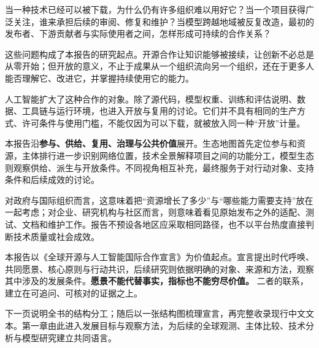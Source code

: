 \clearpage{}
\label{ch1-preface}
当一种技术已经可以被下载，为什么仍有许多组织难以用好它？当一个项目获得广泛关注，谁来承担后续的审阅、修复和维护？当模型跨越地域被反复改造，最初的发布者、下游贡献者与实际使用者之间，怎样形成可持续的合作关系？

这些问题构成了本报告的研究起点。开源合作让知识能够被接续，让创新不必总是从零开始；但开放的意义，不止于成果从一个组织流向另一个组织，还在于更多人能否理解它、改进它，并掌握持续使用它的能力。

人工智能扩大了这种合作的对象。除了源代码，模型权重、训练和评估说明、数据、工具链与运行环境，也进入开放与复用的讨论。它们并不具有相同的生产方式、许可条件与使用门槛，不能仅因为可以下载，就被放入同一种“开放”计量。

本报告沿\textbf{参与、供给、复用、治理与公共价值}展开。生态地图首先定位参与和资源，主体排行进一步识别网络位置，技术全景解释项目之间的功能分工，模型生态则观察供给、派生与开放条件。不同视角相互补充，最终服务于对行动对象、支持条件和后续成效的讨论。

对政府与国际组织而言，这意味着把“资源增长了多少”与“哪些能力需要支持”放在一起考虑；对企业、研究机构与社区而言，则意味着看见原始发布之外的适配、测试、文档和维护工作。报告不预设各地区应采取相同路径，也不以平台热度直接判断技术质量或社会成效。

本报告以《全球开源与人工智能国际合作宣言》为价值起点。宣言提出时代呼唤、共同愿景、核心原则与行动共识，后续研究则依据明确的对象、来源和方法，观察其中涉及的发展条件。\textbf{愿景不能代替事实，指标也不能穷尽价值。} 二者的联系，建立在可追问、可核对的证据之上。

下一页说明全书的结构分工；随后以一张结构图梳理宣言，再完整收录现行中文文本。第一章由此进入发展目标与观察方法，为后续的全球观测、主体比较、技术分析与模型研究建立共同语言。

